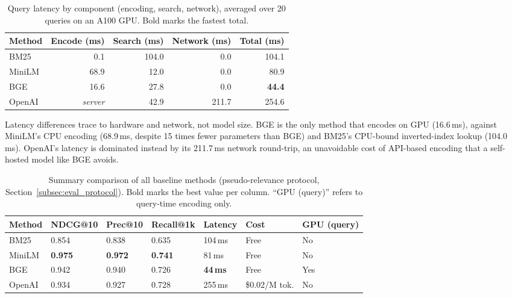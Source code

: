 \documentclass[a4paper,oneside,bibliography=totoc]{scrbook}
\begin{document}
\begin{table}[ht]
\centering
\caption{Query latency by component (encoding, search, network), averaged over 20 queries on an A100 GPU. Bold marks the fastest total.}
\label{tab:latency}
\setlength{\tabcolsep}{8pt}
\begin{tabular}{lrrrr}
\toprule
\textbf{Method}
& \textbf{Encode (ms)}
& \textbf{Search (ms)}
& \textbf{Network (ms)}
& \textbf{Total (ms)} \\
\midrule
BM25   &   0.1 & 104.0 &   0.0 & 104.1 \\
MiniLM &  68.9 &  12.0 &   0.0 &  80.9 \\
BGE    &  16.6 &  27.8 &   0.0 &  \textbf{44.4} \\
OpenAI & \textit{server} &  42.9 & 211.7 & 254.6 \\
\bottomrule
\end{tabular}
\end{table}

Latency differences trace to hardware and network, not model size. BGE is the only method that encodes on GPU (16.6\,ms), against MiniLM's CPU encoding (68.9\,ms, despite 15 times fewer parameters than BGE) and BM25's CPU-bound inverted-index lookup (104.0\,ms). OpenAI's latency is dominated instead by its 211.7\,ms network round-trip, an unavoidable cost of API-based encoding that a self-hosted model like BGE avoids.

\begin{table}[ht]
\centering
\caption{Summary comparison of all baseline methods (pseudo-relevance protocol, Section~\ref{subsec:eval_protocol}). Bold marks the best value per column. ``GPU (query)'' refers to query-time encoding only.}
\label{tab:summary}
\small
\setlength{\tabcolsep}{4pt}
\begin{tabular}{lllllll}
\toprule
\textbf{Method}
& \textbf{NDCG@10}
& \textbf{Prec@10}
& \textbf{Recall@1k}
& \textbf{Latency}
& \textbf{Cost}
& \textbf{GPU (query)} \\
\midrule
BM25   & 0.854 & 0.838 & 0.635 & 104\,ms & Free    & No \\
MiniLM & \textbf{0.975} & \textbf{0.972} & \textbf{0.741} & 81\,ms  & Free    & No \\
BGE    & 0.942 & 0.940 & 0.726 & \textbf{44\,ms} & Free & Yes \\
OpenAI & 0.934 & 0.927 & 0.728 & 255\,ms & \$0.02/M tok. & No \\
\bottomrule
\end{tabular}
\end{table}
\end{document}
